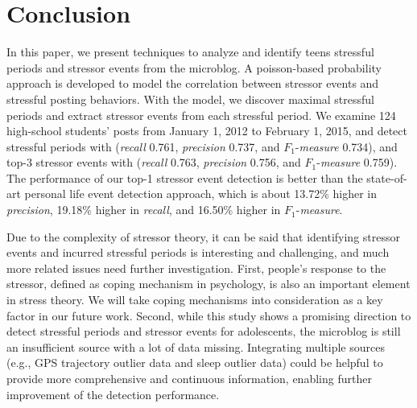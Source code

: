 \section{Conclusion}
In this paper, we present techniques to analyze and identify teens stressful periods and stressor events from the microblog.
A poisson-based probability approach is developed to
model the correlation between stressor events and stressful posting behaviors.
With the model, we discover maximal stressful periods
and extract stressor events from each stressful period.
We examine 124 high-school students' posts from January 1, 2012 to February 1, 2015, and
detect stressful periods with
(\emph{recall} 0.761, \emph{precision} 0.737, and $F_1$-\emph{measure} 0.734),
and top-3 stressor events with (\emph{recall} 0.763, \emph{precision} 0.756, and $F_1$-\emph{measure} 0.759).
The performance of our top-1 stressor event detection is better than
the state-of-art personal life event detection approach, which is about
13.72\% higher in \emph{precision}, 19.18\% higher in \emph{recall}, and 16.50\% higher in $F_1$-\emph{measure}.

Due to the complexity of stressor theory, it can be said that identifying stressor events and incurred stressful periods is interesting and challenging, and much more
related issues need further investigation.
First, people's response to the stressor, defined as coping mechanism in psychology, is also an important element in stress theory.
We will take coping mechanisms into consideration as a key factor in our future work.
Second, while this study shows a promising direction to detect stressful periods and stressor events for adolescents,
the microblog is still an insufficient source with a lot of data missing.
Integrating multiple sources (e.g., GPS trajectory outlier data and sleep outlier data)
could be helpful to provide more comprehensive and continuous information,
enabling further improvement of the detection performance.



